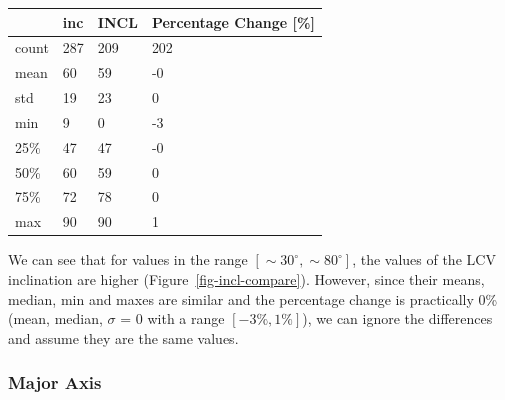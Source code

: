 \documentclass[
]{article}
\begin{document}
\begin{longtable}[]{@{}llll@{}}
\toprule\noalign{}
& inc & INCL & Percentage Change {[}\%{]} \\
\midrule\noalign{}
\endhead
\bottomrule\noalign{}
\endlastfoot
count & 287 & 209 & 202 \\
mean & 60 & 59 & -0 \\
std & 19 & 23 & 0 \\
min & 9 & 0 & -3 \\
25\% & 47 & 47 & -0 \\
50\% & 60 & 59 & 0 \\
75\% & 72 & 78 & 0 \\
max & 90 & 90 & 1 \\
\end{longtable}

We can see that for values in the range
\([\sim 30^\circ,\sim 80^\circ]\), the values of the LCV inclination are
higher (Figure~\ref{fig-incl-compare}). However, since their means,
median, min and maxes are similar and the percentage change is
practically 0\% (mean, median, \(\sigma\) = 0 with a range
\([-3\%,1\%]\)), we can ignore the differences and assume they are the
same values.

\subsubsection{Major Axis}
\end{document}
